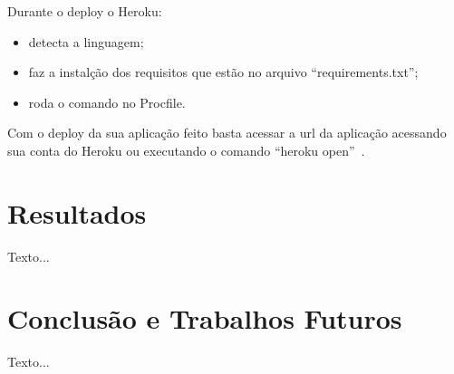 \documentclass[a4paper, 12pt, oneside]{book}
\begin{document}
Durante o deploy o Heroku:
\begin{itemize}
\item detecta a linguagem;
\item faz a instalção dos requisitos que estão no arquivo ``requirements.txt'';
\item roda o comando no Procfile.
\end{itemize}

Com o deploy da sua aplicação feito basta acessar a url da aplicação acessando sua conta do Heroku ou executando o comando ``heroku open''~\cite{heroku-python}.

\chapter{Resultados}
\thispagestyle{empty} 

Texto...

\chapter{Conclusão e Trabalhos Futuros}
\thispagestyle{empty} 

Texto...



\end{document}
